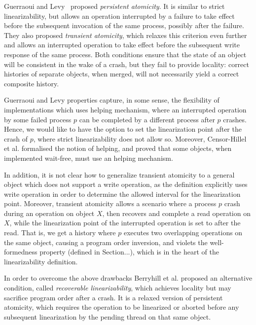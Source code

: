 Guerraoui and Levy~\cite{DBLP:conf/icdcs/GuerraouiL04} proposed \emph{persistent atomicity}. It is similar to strict linearizability, but allows an operation interrupted by a failure to take effect before the subsequent invocation of the same process, possibly after the failure. They also proposed \emph{transient atomicity}, which relaxes this criterion even further and allows an interrupted operation to take effect before the subsequent write response of the same process. Both conditions ensure that the state of an object will be consistent in the wake of a crash, but they fail to provide locality: correct histories of separate objects, when merged, will not necessarily yield a correct composite history.

Guerraoui and Levy properties capture, in some sense, the flexibility of implementations which uses helping mechanism, where an interrupted operation by some failed process $p$ can be completed by a different process after $p$ crashes. Hence, we would like to have the option to set the linearization point after the crash of $p$, where strict linearizability does not allow so. Moreover, Censor-Hillel et al. \cite{DBLP:conf/podc/Censor-HillelPT15} formalised the notion of helping, and proved that some objects, when implemented wait-free, must use an helping mechanism.

In addition, it is not clear how to generalize transient atomicity to a general object which does not support a write operation, as the definition explicitly uses write operation in order to determine the allowed interval for the linearization point. Moreover, transient atomicity allows a scenario where a process $p$ crash during an operation on object $X$, then recovers and complete a read operation on $X$, while the linearization point of the interrupted operation is set to after the read. That is, we get a history where $p$ executes two overlapping operations on the same object, causing a program order inversion, and violets the well-formedness property (defined in Section...), which is in the heart of the linearizability definition.

In order to overcome the above drawbacks Berryhill et al. \cite{DBLP:conf/opodis/BerryhillGT15} proposed an alternative condition, called \emph{recoverable linearizability}, which achieves locality but may sacrifice program order after a crash. It is a relaxed version of persistent atomicity, which requires the operation to be linearized or aborted before any subsequent linearization by the pending thread on that same object.

